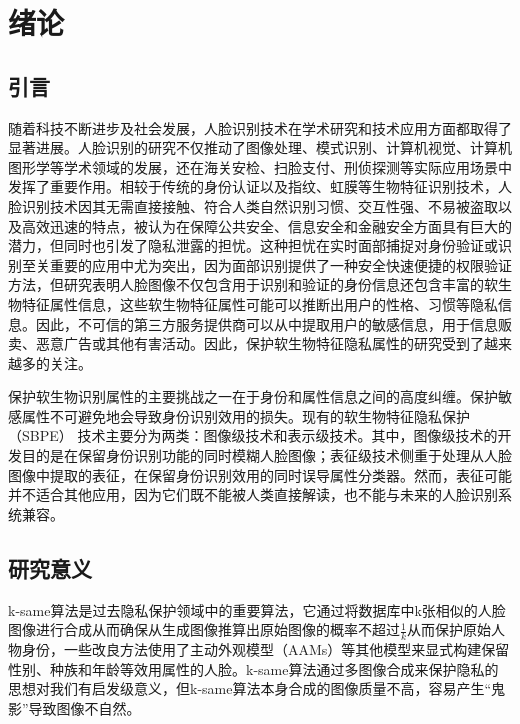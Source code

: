 \documentclass[UTF8,a4paper,12pt]{ctexart}
\numberwithin{equation}{section}
\begin{document}
\section{绪论}
\subsection{引言}
随着科技不断进步及社会发展，人脸识别技术在学术研究和技术应用方面都取得了显著进展。人脸识别的研究不仅推动了图像处理、模式识别、计算机视觉、计算机图形学等学术领域的发展，还在海关安检、扫脸支付、刑侦探测等实际应用场景中发挥了重要作用。相较于传统的身份认证以及指纹、虹膜等生物特征识别技术，人脸识别技术因其无需直接接触、符合人类自然识别习惯、交互性强、不易被盗取以及高效迅速的特点，被认为在保障公共安全、信息安全和金融安全方面具有巨大的潜力\cite{基于深度卷积神经网络的人脸识别技术综述}，但同时也引发了隐私泄露的担忧。这种担忧在实时面部捕捉对身份验证或识别至关重要的应用中尤为突出\cite{A survey on machine learning-based facial recognition algorithm}，因为面部识别提供了一种安全快速便捷的权限验证方法，但研究\cite{An overview of privacy-enhancing technologies in biometric recognition, How good is ChatGPT at face biometrics}表明人脸图像不仅包含用于识别和验证的身份信息还包含丰富的软生物特征属性信息，这些软生物特征属性可能可以推断出用户的性格、习惯等隐私信息。因此，不可信的第三方服务提供商可以从中提取用户的敏感信息，用于信息贩卖、恶意广告或其他有害活动。因此，保护软生物特征隐私属性的研究受到了越来越多的关注。

保护软生物识别属性的主要挑战之一在于身份和属性信息之间的高度纠缠。保护敏感属性不可避免地会导致身份识别效用的损失。现有的软生物特征隐私保护（SBPE）\cite{Soft biometrics: a survey. Multim Tools Appl} 技术主要分为两类：图像级技术和表示级技术。其中，图像级技术的开发目的是在保留身份识别功能的同时模糊人脸图像；表征级技术侧重于处理从人脸图像中提取的表征，在保留身份识别效用的同时误导属性分类器。然而，表征可能并不适合其他应用，因为它们既不能被人类直接解读，也不能与未来的人脸识别系统兼容。

\subsection{研究意义}
k-same算法是过去隐私保护领域中的重要算法\cite{Preserving privacy
by de-identifying face images}，它通过将数据库中k张相似的人脸图像进行合成从而确保从生成图像推算出原始图像的概率不超过$\frac{1}{k}$从而保护原始人物身份，一些改良方法使用了主动外观模型（AAMs）\cite{Active appearance models revisited}等其他模型来显式构建保留性别、种族和年龄等效用属性的人脸\cite{Attribute preserved face de-identification}。k-same算法通过多图像合成来保护隐私的思想对我们有启发级意义，但k-same算法本身合成的图像质量不高，容易产生“鬼影”导致图像不自然。
\end{document}
